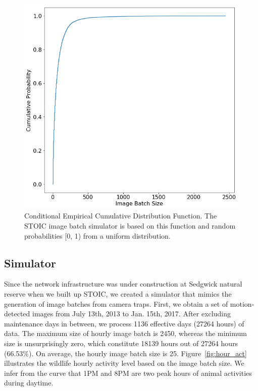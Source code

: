  
\begin{figure}[t] \centering 
\includegraphics[scale=0.36]{figures/ecdf.png}
\caption{Conditional Empirical Cumulative Distribution Function. The STOIC image batch simulator is based on this function and random probabilities [0, 1) from a uniform distribution.
\label{fig:cecdf}}
\end{figure} 
 
\subsection{Simulator}

Since the network infrastructure was under construction at Sedgwick natural
reserve when we built up STOIC, we created a simulator that mimics the
generation of image batches from camera traps. First, we obtain a set of
motion-detected images from July 13th, 2013 to Jan. 15th, 2017. After
excluding maintenance days in between, we process 1136 effective days (27264
hours) of data. The maximum size of hourly image batch is 2450, whereas the
minimum size is unsurprisingly zero, which constitute 18139 hours out of 27264
hours (66.53\%). On average, the hourly image batch size is 25.
Figure~\ref{fig:hour_act} illustrates the wildlife hourly activity level based
on the image batch size. We infer from the curve that 1PM and 8PM are two peak
hours of animal activities during daytime. 

